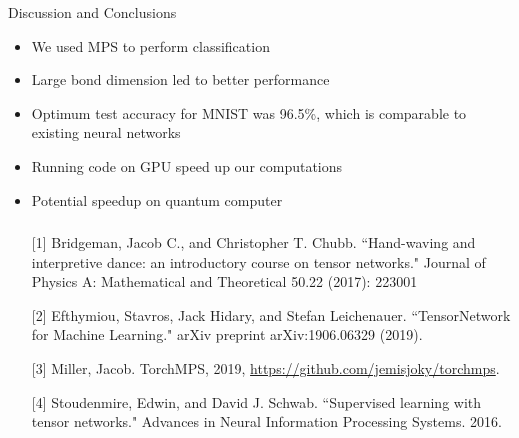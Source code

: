 \documentclass[llpt]{beamer}
\begin{document}
\begin{frame}{Discussion and Conclusions}
    \begin{itemize}
        \item We used MPS to perform classification
        \item Large bond dimension led to better performance 
        \item Optimum test accuracy for MNIST was 96.5\%, which is comparable to existing neural networks
        \item Running code on GPU speed up our computations
        \item Potential speedup on quantum computer
    \end{itemize}
\end{frame}
    

\begin{frame}
\frametitle{}
\small
\begin{itemize}
  \item[] [1] Bridgeman, Jacob C., and Christopher T. Chubb. ``Hand-waving and interpretive dance: an introductory course on tensor networks." Journal of Physics A: Mathematical and Theoretical 50.22 (2017): 223001
  \item[] [2] Efthymiou, Stavros, Jack Hidary, and Stefan Leichenauer. ``TensorNetwork for Machine Learning." arXiv preprint arXiv:1906.06329 (2019).
  \item[] [3] Miller, Jacob. TorchMPS, 2019, \url{https://github.com/jemisjoky/torchmps}.
  \item[] [4] Stoudenmire, Edwin, and David J. Schwab. ``Supervised learning with tensor networks." Advances in Neural Information Processing Systems. 2016.

\end{itemize}
\end{frame}
\end{document}
